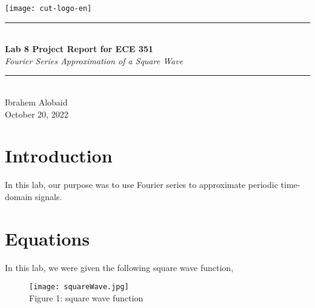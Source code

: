 \documentclass[12pt,a4paper]{article}
\newcommand{\HRule}{\rule{\linewidth}{0.5mm}}
\begin{document}
\begin{titlepage}
\begin{center}
\texttt{[image: cut-logo-en]}~\\[2cm]
\HRule \\[0.4cm]
{ \LARGE 
  \textbf{Lab 8 Project Report for ECE 351}\\[0.4cm]
  \emph{Fourier Series Approximation of a Square Wave}\\[0.4cm]
}
\HRule \\[1.5cm]
{ \large
  Ibrahem Alobaid \\[0.1cm]
  October 20, 2022\\[0.1cm]
}
\vfill

\end{center}
\end{titlepage}
\newpage
\tableofcontents
{}
\newpage
\setcounter{page}{1}
\section{Introduction}\label{sec:intro}
    In this lab, our purpose was to use Fourier series to approximate periodic time-domain signals.

\section{Equations}\label{sec:lit-rev}

In this lab, we were given the following square wave function,

\begin{figure}[h]
    \centering
    \texttt{[image: squareWave.jpg]}
    \\ Figure 1: square wave function
\end{figure}\textbf{}
\end{document}

